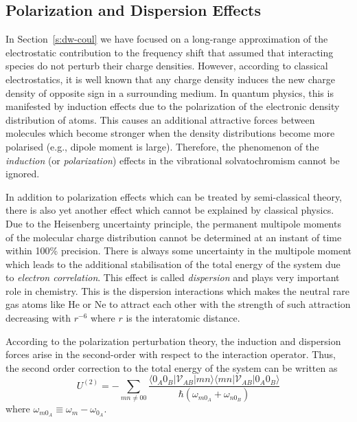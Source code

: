 \documentclass[a4paper,titlepage,twoside,fleqn,12pt]{book}
\begin{document}
\begin{refsection}
\subsection{Polarization and Dispersion Effects\label{s:dw-poldisp}}

In Section~\ref{s:dw-coul} we have focused on a long\hyp{}range
approximation of the electrostatic contribution to the frequency
shift that assumed that interacting species do not perturb
their charge densities. However, according to classical electrostatics,
it is well known that any charge density induces the new
charge density of opposite sign in a surrounding medium. In quantum
physics, this is manifested by induction effects due to the polarization
of the electronic density distribution of atoms. This causes
an additional attractive forces between molecules which
become stronger when the density distributions become more polarised
(e.g., dipole moment is large). Therefore, the
phenomenon of the \emph{induction} (or \emph{polarization}) effects
in the vibrational solvatochromism cannot be ignored.

In addition to polarization effects which can be treated
by semi\hyp{}classical theory, there is also yet another effect
which cannot be explained by classical physics. Due to the Heisenberg
uncertainty principle, the permanent multipole moments of the 
molecular charge distribution cannot be determined at an instant
of time within 100\% precision. There is always some uncertainty
in the multipole moment which leads to the additional stabilisation
of the total energy of the system due to \emph{electron correlation}. This effect is
called \emph{dispersion} and plays very important role in chemistry.
This is the dispersion interactions which makes the neutral rare gas atoms 
like He or Ne
to attract each other with the strength of such attraction decreasing
with $r^{-6}$ where $r$ is the interatomic distance.

According to the polarization perturbation theory, the induction
and dispersion forces arise in the second\hyp{}order with respect to
the interaction 
operator. \citep{Stone.TheTheoryOfIntermolecularForces.1996,
Jeziorski.Moszynski.Szalewicz.ChemRev.1994} 
Thus, the second order correction to the total
energy of the system can be written as
%
\begin{equation} \label{e:eint-2}
U^{(2)} = - \sum_{mn\ne 00} \frac{
\langle 0_A0_B \lvert \mathscr{V}_{AB} \rvert mn \rangle \langle  mn \lvert \mathscr{V}_{AB} \rvert 0_A0_B \rangle
}{\hbar \left( \omega_{m0_A} + \omega_{n0_B}\right)}
\end{equation}
%
where $\omega_{m0_A} \equiv \omega_{m} - \omega_{0_A}$.


\end{refsection}
\end{document}
